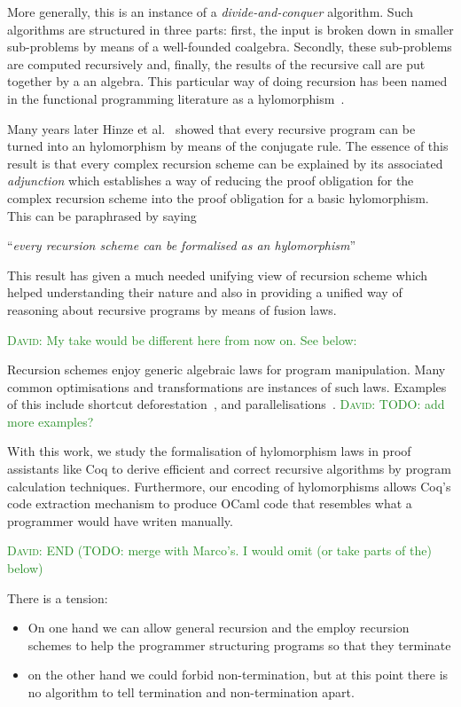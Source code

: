 \documentclass[anonymous, a4paper, UKenglish, cleveref, autoref, thm-restate]{lipics-v2021}
\newcommand{\dcas}[1]{\textcolor{ForestGreen}{\textsc{David}: #1}}
\begin{document}
More generally, this is an instance of a \emph{divide-and-conquer} algorithm.
Such algorithms are structured in three parts: first, the input is broken down
in smaller sub-problems by means of a well-founded coalgebra. Secondly, these
sub-problems are computed recursively and, finally, the results of the recursive
call are put together by a an algebra. This particular way of doing recursion
has been named in the functional programming literature as a
hylomorphism~\cite{MeijerFP91, HuIT96}.

Many years later Hinze et al.~\cite{HinzeWG15} showed that every recursive
program can be turned into an hylomorphism by means of the conjugate rule. The
essence of this result is that every complex recursion scheme can be explained
by its associated \emph{adjunction} which establishes a way of reducing the
proof obligation for the complex recursion scheme into the proof obligation for
a basic hylomorphism. This can be paraphrased by saying
\begin{center}
  ``\emph{every recursion scheme can be formalised as an hylomorphism}''
\end{center}

This result has given a much needed unifying view of recursion scheme which
helped understanding their nature and also in providing a unified way of
reasoning about recursive programs by means of fusion laws.

\dcas{My take would be different here from now on. See below:}

Recursion schemes enjoy generic algebraic laws for program manipulation. Many
common optimisations and transformations are instances of such laws. Examples of
this include shortcut deforestation~\cite{TakanoM95}, and
parallelisations~\cite{Gibbons96:Third}. \dcas{TODO: add more examples?}

With this work, we study the formalisation of hylomorphism laws in proof
assistants like Coq to derive efficient and correct recursive algorithms by
program calculation techniques. Furthermore, our encoding of hylomorphisms
allows Coq's code extraction mechanism to produce OCaml code that resembles what
a programmer would have writen manually.

\dcas{END (TODO: merge with Marco's. I would omit (or take parts of the) below)}

There is a tension:
\begin{itemize}
  \item On one hand we can allow general recursion and the employ recursion
schemes to help the programmer structuring programs so that they terminate
  \item on the other hand we could forbid non-termination, but at this point
there is no algorithm to tell termination and non-termination apart.
\end{itemize}
\end{document}
